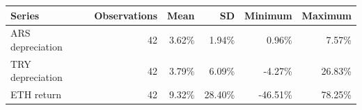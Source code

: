 \begin{tabular}{lrrrrr}
\toprule
Series & Observations & Mean & SD & Minimum & Maximum \\
\midrule
ARS depreciation & 42 & 3.62\% & 1.94\% & 0.96\% & 7.57\% \\
TRY depreciation & 42 & 3.79\% & 6.09\% & -4.27\% & 26.83\% \\
ETH return & 42 & 9.32\% & 28.40\% & -46.51\% & 78.25\% \\
\bottomrule
\end{tabular}
